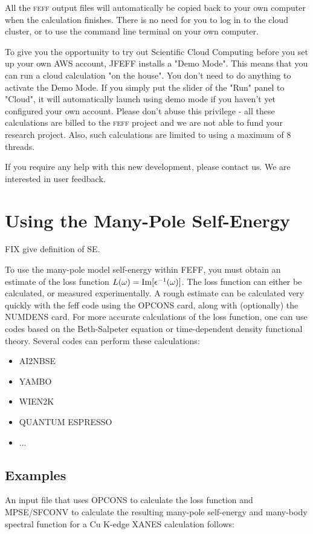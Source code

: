 \documentclass[11pt,oneside]{report} %
\renewcommand{\htmlref}[2]{\hyperlink{#2}{#1}}
\newcommand{\program}[1]{\textsc{#1}}
\newcommand{\feff}{\program{feff}}
\renewcommand{\htmlref}[2]{{#1}} %
\begin{document}
All the {\feff} output files will automatically be copied back to your own computer when the calculation finishes.  There is no need for you to log in to the cloud cluster, or to use the command line terminal on your own computer.

To give you the opportunity to try out Scientific Cloud Computing before you set up your own AWS account, JFEFF installs a "Demo Mode".  This means that you can run a cloud calculation "on the house".  You don't need to do anything to activate the Demo Mode.  If you simply put the slider of the "Run" panel to "Cloud", it will automatically launch using demo mode if you haven't yet configured your own account.  Please don't abuse this privilege - all these calculations are billed to the {\feff} project and we are not able to fund your research project.  Also, such calculations are limited to using a maximum of 8 threads. 

If you require any help with this new development, please contact us.  We are interested in user feedback.



\section{Using the Many-Pole Self-Energy}
\label{Sec:MPSE}
FIX give definition of SE.

To use the many-pole model self-energy within FEFF, you must obtain an
estimate of the loss function $L(\omega) = {\rm
  Im}[\epsilon^{-1}(\omega)]$. The loss function can either be
calculated, or measured experimentally. A rough estimate can be
calculated very quickly with the feff code using the
\htmlref{OPCONS}{card:opc} 
card, along with (optionally) the \htmlref{NUMDENS}{card:num} card.
For more accurate calculations of the loss function, one can use codes
based on the Beth-Salpeter equation or time-dependent density
functional theory. Several codes can perform these calculations:
\begin{itemize} \tightlist
  \item{AI2NBSE}
  \item{YAMBO}
  \item{WIEN2K}
  \item{QUANTUM ESPRESSO}
  \item ...
\end{itemize}

\subsection{Examples}
An input file that uses OPCONS to calculate the loss function
and MPSE/SFCONV to calculate the resulting many-pole self-energy and
many-body spectral function for a Cu K-edge XANES calculation
follows:
\end{document}
